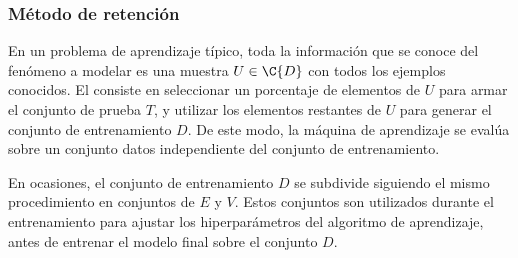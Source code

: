 %
\subsubsection{Método de retención}
\label{retencion}
%
En un problema de aprendizaje típico, toda la información que se
conoce del fenómeno a modelar es una muestra $U\in\C{D}$ con todos los
ejemplos conocidos.
El  consiste en seleccionar
un porcentaje de elementos de $U$ para armar el conjunto de prueba
$T$, y utilizar los elementos restantes de $U$ para generar el
conjunto de entrenamiento $D$.
De este modo, la máquina de aprendizaje
se evalúa sobre un conjunto datos independiente del conjunto de
entrenamiento.

En ocasiones, el conjunto de entrenamiento $D$ se subdivide siguiendo
el mismo procedimiento en conjuntos de  $E$ y
 $V$.
Estos conjuntos son utilizados durante el
entrenamiento para ajustar los hiperparámetros del algoritmo de
aprendizaje, antes de entrenar el modelo final sobre el conjunto $D$.
